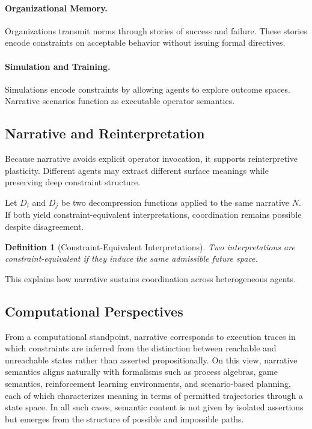 \documentclass[11pt]{article}
\newtheorem{definition}{Definition}
\begin{document}
\paragraph{Organizational Memory.}
Organizations transmit norms through stories of success and failure. These
stories encode constraints on acceptable behavior without issuing formal
directives.

\paragraph{Simulation and Training.}
Simulations encode constraints by allowing agents to explore outcome spaces.
Narrative scenarios function as executable operator semantics.

\subsection{Narrative and Reinterpretation}

Because narrative avoids explicit operator invocation, it supports reinterpretive
plasticity. Different agents may extract different surface meanings while
preserving deep constraint structure.

Let $D_i$ and $D_j$ be two decompression functions applied to the same narrative
$N$. If both yield constraint-equivalent interpretations, coordination remains
possible despite disagreement.

\begin{definition}[Constraint-Equivalent Interpretations]
Two interpretations are constraint-equivalent if they induce the same admissible
future space.
\end{definition}

This explains how narrative sustains coordination across heterogeneous agents.

\subsection{Computational Perspectives}

From a computational standpoint, narrative corresponds to execution traces in
which constraints are inferred from the distinction between reachable and
unreachable states rather than asserted propositionally. On this view, narrative
semantics aligns naturally with formalisms such as process algebras, game
semantics, reinforcement learning environments, and scenario-based planning,
each of which characterizes meaning in terms of permitted trajectories through a
state space. In all such cases, semantic content is not given by isolated
assertions but emerges from the structure of possible and impossible paths.
\end{document}

